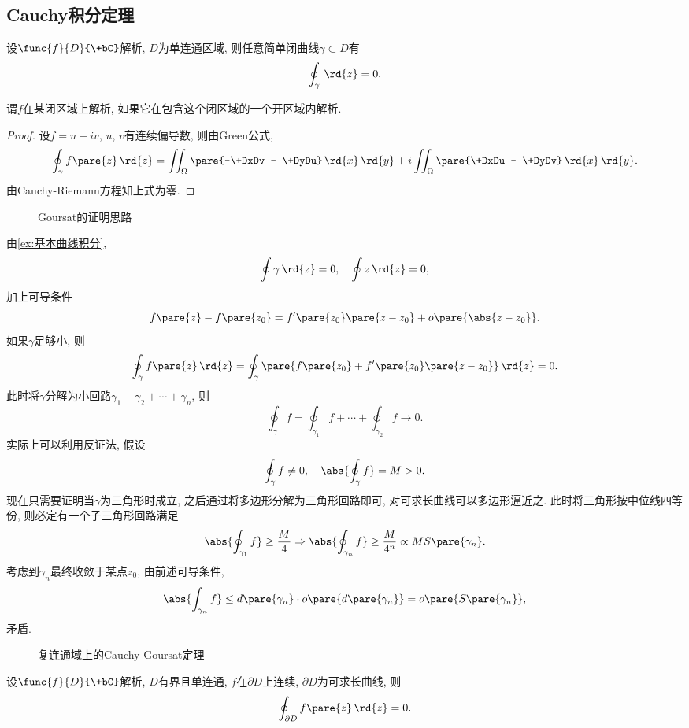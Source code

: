 \documentclass[../ComplexVariable.tex]{subfiles}
\begin{document}
\subsection{Cauchy积分定理} %
\label{sub:cauchy积分定理}

\begin{theorem}
    设$\func{f}{D}{\+bC}$解析, $D$为单连通区域, 则任意简单闭曲线$\gamma\subset D$有
    \[ \oint_\gamma \,\rd{z} = 0. \]
\end{theorem}
\begin{remark}
    谓$f$在某闭区域上解析, 如果它在包含这个闭区域的一个开区域内解析.
\end{remark}
\begin{proof}
    设$f=u+iv$, $u$, $v$有连续偏导数, 则由Green公式,
    \[ \oint_\gamma f\pare{z}\,\rd{z} = \iint_\Omega \pare{-\+DxDv - \+DyDu}\,\rd{x}\,\rd{y} + i\iint_\Omega \pare{\+DxDu - \+DyDv} \,\rd{x}\,\rd{y}. \]
    由Cauchy-Riemann方程知上式为零.
\end{proof}
\begin{figure}[ht]
    \centering
    \caption{Goursat的证明思路}
    \label{fig:Goursat的证明思路}
\end{figure}
由\cref{ex:基本曲线积分},
\[ \oint\gamma\,\rd{z} = 0,\quad \oint z\,\rd{z} = 0, \]
加上可导条件
\[ f\pare{z} - f\pare{z_0} = f'\pare{z_0}\pare{z-z_0} + o\pare{\abs{z-z_0}}. \]
如果$\gamma$足够小, 则
\[ \oint_\gamma f\pare{z}\,\rd{z} = \oint_\gamma \pare{f\pare{z_0} + f'\pare{z_0}\pare{z-z_0}}\,\rd{z} = 0. \]
此时将$\gamma$分解为小回路$\gamma_1 + \gamma_2 + \cdots + \gamma_n$, 则
\[ \oint_\gamma f  = \oint_{\gamma_1} f + \cdots + \oint_{\gamma_2} f \rightarrow 0. \]
实际上可以利用反证法, 假设
\[ \oint_\gamma f \neq 0,\quad \abs{\oint_\gamma f} = M > 0. \]
现在只需要证明当$\gamma$为三角形时成立, 之后通过将多边形分解为三角形回路即可, 对可求长曲线可以多边形逼近之. 此时将三角形按中位线四等份, 则必定有一个子三角形回路满足
\[ \abs{\oint_{\gamma_1} f} \ge \frac{M}{4}\Rightarrow \abs{\oint_{\gamma_n} f} \ge \frac{M}{4^n} \propto MS\pare{\gamma_n}. \]
考虑到$\gamma_n$最终收敛于某点$z_0$, 由前述可导条件,
\[ \abs{\int_{\gamma_n} f} \le d\pare{\gamma_n}\cdot o\pare{d\pare{\gamma_n}} = o\pare{S\pare{\gamma_n}}, \]
矛盾.
\begin{figure}[ht]
    \centering
    \caption{复连通域上的Cauchy-Goursat定理}
    \label{fig:复连通域上的Cauchy-Goursat定理}
\end{figure}
\begin{theorem}
    设$\func{f}{D}{\+bC}$解析, $D$有界且单连通, $f$在$\partial D$上连续, $\partial D$为可求长曲线, 则
    \[ \oint_{\partial D} f\pare{z}\,\rd{z} = 0. \]
\end{theorem}
\end{document}
